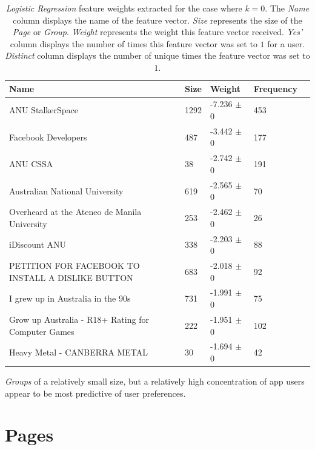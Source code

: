 \begin{table}[h]
\begin{minipage}[b]{1.0\textwidth}
\centering
  \begin{tabular}{|l|l|l|l|l|} %
  \hline
  \textbf{Name} & \textbf{Size} & \textbf{Weight} & \textbf{Frequency} \\ \hline
ANU StalkerSpace & 1292 & -7.236 $\pm$ 0 & 453 \\ \hline
Facebook Developers & 487 & -3.442 $\pm$ 0 & 177 \\ \hline
ANU CSSA & 38 & -2.742 $\pm$ 0 & 191 \\ \hline
Australian National University & 619 & -2.565 $\pm$ 0 & 70 \\ \hline
Overheard at the Ateneo de Manila University & 253 & -2.462 $\pm$ 0 & 26 \\ \hline
iDiscount ANU & 338 & -2.203 $\pm$ 0 & 88 \\ \hline
PETITION FOR FACEBOOK TO INSTALL A DISLIKE BUTTON & 683 & -2.018 $\pm$ 0 & 92 \\ \hline
I grew up in Australia in the 90s & 731 & -1.991 $\pm$ 0 & 75 \\ \hline
Grow up Australia - R18+ Rating for Computer Games & 222 & -1.951 $\pm$ 0 & 102 \\ \hline
Heavy Metal - CANBERRA METAL & 30 & -1.694 $\pm$ 0 & 42 \\ \hline
  \end{tabular}
  \caption{\emph{Logistic Regression} feature weights extracted for the case where $k=0$. The \emph{Name} column displays the name of the feature vector.
                        \emph{Size} represents the size of the \emph{Page} or \emph{Group}.
                        \emph{Weight} represents the weight this feature vector received.  
                        \emph{Yes'} column displays the number of times this feature vector was set to $1$ for a user.
                        \emph{Distinct} column displays the number of unique times the feature vector was set to $1$.}
\end{minipage}
\end{table}

\emph{Groups} of a relatively small size, but a relatively high concentration of app users appear to be most predictive of user 
preferences.

\section{Pages}
\label{sec:pages}

